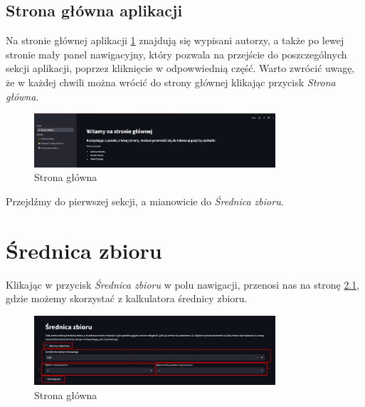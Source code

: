 \documentclass[a4paper,twoside,11pt]{mwrep}
\begin{document}
\section{Strona główna aplikacji}

Na stronie głównej aplikacji \ref{rys:sg} znajdują się wypisani autorzy, a także po lewej stronie mały panel nawigacyjny, który pozwala na przejście do poszczególnych sekcji aplikacji, poprzez kliknięcie w odpowwiednią część. Warto zwrócić uwagę, że w każdej chwili można wrócić do strony głównej klikając przycisk \textit{Strona główna}. 

\begin{figure}[H] 
    \centering
    \includegraphics[width=0.8\textwidth]{figure/Screenshot_1.jpg}
    \caption{Strona główna}\label{rys:sg}
\end{figure}

Przejdźmy do pierwszej sekcji, a mianowicie do \textit{Średnica zbioru}.

\chapter{Średnica zbioru}

Klikając w przycisk \textit{Średnica zbioru} w polu nawigacji, przenosi nas na stronę \ref{rys:sz}, gdzie możemy skorzystać z kalkulatora średnicy zbioru. 

\begin{figure}[H] 
    \centering
    \includegraphics[width=0.8\textwidth]{figure/Screenshot_2.jpg}
    \caption{Strona główna}\label{rys:sz}
\end{figure}
\end{document}
